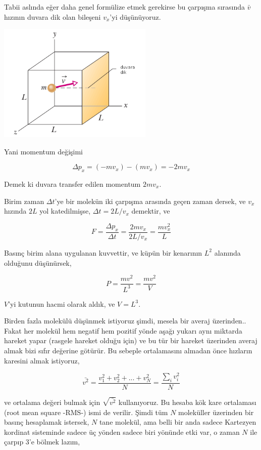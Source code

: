 \documentclass[12pt,fleqn]{article}\usepackage{../../common}
\begin{document}
Tabii aslında eğer daha genel formülize etmek gerekirse bu çarpışma sırasında
$\bar{v}$ hızının duvara dik olan bileşeni $v_x$'yi düşünüyoruz.

\includegraphics[width=20em]{phy_005_basics_05.png}

Yani momentum değişimi

$$
\Delta p_x = (-m v_x) - (m v_x) = - 2 m v_x 
$$

Demek ki duvara transfer edilen momentum $2 m v_x$. 

Birim zaman $\Delta t$'ye bir molekün iki çarpışma arasında geçen zaman dersek,
ve $v_x$ hızında $2L$ yol katedilmişse, $\Delta t  = 2 L / v_x$ demektir, ve

$$
F = \frac{\Delta p_x}{\Delta t} = \frac{2 m v_x}{2 L / v_x} = \frac{m v_x^2}{L}
$$

Basınç birim alana uygulanan kuvvettir, ve küpün bir kenarının $L^2$ alanında
olduğunu düşünürsek, 

$$
P = \frac{m v^2}{L^3} = \frac{m v^2}{V}
$$

$V$'yi kutunun hacmi olarak aldık, ve $V = L^3$.

Birden fazla molekülü düşünmek istiyoruz şimdi, mesela bir averaj
üzerinden.. Fakat her molekül hem negatif hem pozitif yönde aşağı yukarı aynı
miktarda hareket yapar (rasgele hareket olduğu için) ve bu tür bir hareket
üzerinden averaj almak bizi sıfır değerine götürür. Bu sebeple ortalamasını
almadan önce hızların karesini almak istiyoruz,

$$
\bar{v^2} = \frac{v_1^2 + v_2^2 + ... + v_N^2 }{N} = \frac{\sum_i v_i^2}{N}
$$

ve ortalama değeri bulmak için $\sqrt{\bar{v^2}}$ kullanıyoruz. Bu hesaba kök
kare ortalaması (root mean square -RMS-) ismi de verilir. Şimdi tüm $N$
moleküller üzerinden bir basınç hesaplamak istersek, $N$ tane molekül, ama belli
bir anda sadece Kartezyen kordinat sisteminde sadece üç yönden sadece biri
yönünde etki var, o zaman $N$ ile çarpıp 3'e bölmek lazım, 
\end{document}
